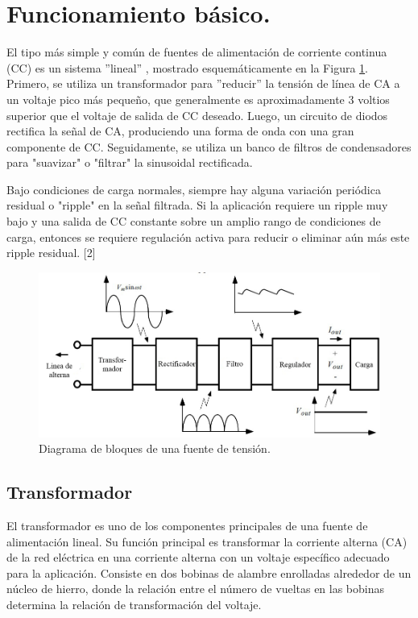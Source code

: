 \section{Funcionamiento básico.} \par 
El tipo más simple y común de fuentes de alimentación de corriente continua (CC) es un sistema ''lineal'' , mostrado esquemáticamente en la Figura \ref{F:componentesFL}. Primero, se utiliza un transformador para ''reducir'' la tensión de línea de CA a un voltaje pico más pequeño, que generalmente es aproximadamente 3 voltios superior que el voltaje de salida de CC deseado. Luego, un circuito de diodos rectifica la señal de CA, produciendo una forma de onda con una gran componente de CC. Seguidamente, se utiliza un banco de filtros de condensadores para "suavizar" o "filtrar" la sinusoidal rectificada. \par 
Bajo condiciones de carga normales, siempre hay alguna variación periódica residual o "ripple" en la señal filtrada. Si la aplicación requiere un ripple muy bajo y una salida de CC constante sobre un amplio rango de condiciones de carga, entonces se requiere regulación activa para reducir o eliminar aún más este ripple residual. [2]\cite{}
\begin{figure}
    \centering
    \includegraphics[scale=0.5]{./imagenes/componentesFL.jpg}
    \caption{Diagrama de bloques de una fuente de tensión.}
    \label{F:componentesFL}
\end{figure}

\subsection{Transformador}\par 
El transformador es uno de los componentes principales de una fuente de alimentación lineal. Su función principal es transformar la corriente alterna (CA) de la red eléctrica en una corriente alterna con un voltaje específico adecuado para la aplicación. Consiste en dos bobinas de alambre enrolladas alrededor de un núcleo de hierro, donde la relación entre el número de vueltas en las bobinas determina la relación de transformación del voltaje.

